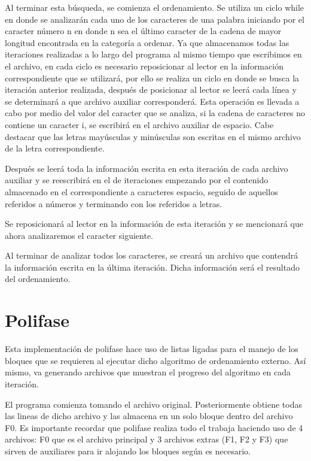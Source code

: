 \documentclass[12pt, letterpaper]{report}
\begin{document}
    Al terminar esta búsqueda, se comienza el ordenamiento. Se utiliza un ciclo while en donde se analizarán cada uno de los caracteres de una palabra iniciando por el caracter número n en donde n sea el último caracter de la cadena de mayor longitud encontrada en la categoría a ordenar. Ya que almacenamos todas las iteraciones realizadas a lo largo del programa al mismo tiempo que escribimos en el archivo, en cada ciclo es necesario reposicionar al lector en la información correspondiente que se utilizará, por ello se realiza un ciclo en donde se busca la iteración anterior realizada, después de posicionar al lector se leerá cada línea y se determinará a que archivo auxiliar corresponderá. Esta operación es llevada a cabo por medio del valor del caracter que se analiza, si la cadena de caracteres no contiene un caracter i, se escribirá en el archivo auxiliar de espacio. Cabe destacar que las letras mayúsculas y minúsculas son escritas en el mismo archivo de la letra correspondiente.
    
    Después se leerá toda la información escrita en esta iteración de cada archivo auxiliar y se reescribirá en el de iteraciones empezando por el contenido almacenado en el correspondiente a caracteres espacio, seguido de aquellos referidos a números y terminando con los referidos a letras.
    
    Se reposicionará al lector en la información de esta iteración y se mencionará que ahora analizaremos el caracter siguiente.
    
    Al terminar de analizar todos los caracteres, se creará un archivo que contendrá la información escrita en la última iteración. Dicha información será el resultado del ordenamiento.
    
    \section*{Polifase}
    
    Esta implementación de polifase hace uso de listas ligadas para el manejo de los bloques que se requieren al ejecutar dicho algoritmo de ordenamiento externo. Así mismo, va generando archivos que muestran el progreso del algoritmo en cada iteración.
    
    El programa comienza tomando el archivo original. Posteriormente obtiene todas las lineas de dicho archivo y las almacena en un solo bloque dentro del archivo F0. Es importante recordar que polifase realiza todo el trabaja haciendo uso de 4 archivos: F0 que es el archivo principal y 3 archivos extras (F1, F2 y F3) que sirven de auxiliares para ir alojando los bloques según es necesario.
    
\end{document}

